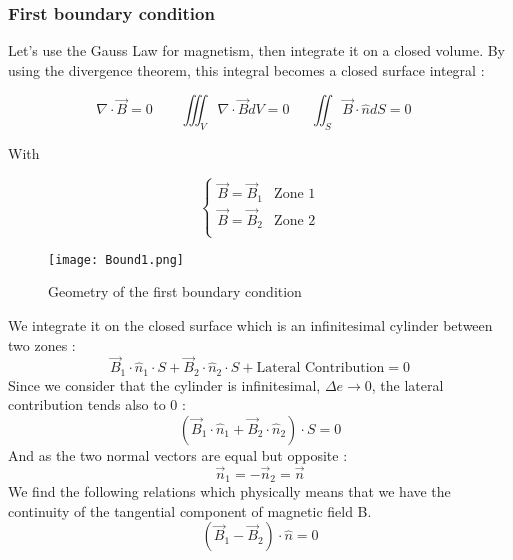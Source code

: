 \subsubsection*{First boundary condition}

Let's use the Gauss Law for magnetism, then integrate it on a closed volume. By using the divergence theorem, this integral becomes a closed surface integral : 

\begin{equation*}
    \nabla \cdot \vec{B} = 0 ~~~~~~~~~ \iiint_V \nabla\cdot \vec{B} dV = 0 ~~~~~~~\iint_S \vec{B}\cdot \hat{n}dS = 0 ~~~~
\end{equation*}

With 

\begin{equation*}
     \left\{
    \begin{array}{ll}
    \vec{B} = \vec{B}_1 & \text{Zone 1} \\
    \vec{B} = \vec{B}_2 & \text{Zone 2} \\
    \end{array}
\right.
\end{equation*}


\begin{figure}[H]
    \centering
    \texttt{[image: Bound1.png]}
    \caption{Geometry of the first boundary condition}
\end{figure}

We integrate it on the closed surface which is an infinitesimal cylinder between two zones : 
\begin{equation*}
    \vec{B}_1\cdot\hat{n}_1\cdot S+ \vec{B}_2\cdot\hat{n}_2\cdot S + \text{Lateral Contribution} = 0
    \end{equation*}
  Since we consider that the cylinder is infinitesimal, $ \Delta e \rightarrow 0$, the lateral contribution tends also to 0 :
    \begin{equation*}
    (\vec{B}_1\cdot\hat{n}_1+ \vec{B}_2\cdot\hat{n}_2)\cdot S = 0  \end{equation*}
    And as the two normal vectors are equal but opposite : 
    \begin{equation*}
    \vec{n}_1 = -\vec{n}_2 = \vec{n}
\end{equation*}
    We find the following relations which physically means that we have the continuity of the tangential component of magnetic field B. 
\begin{equation*}
    \boxed{(\vec{B}_1 - \vec{B}_2)\cdot \hat{n} = 0 }
\end{equation*}


